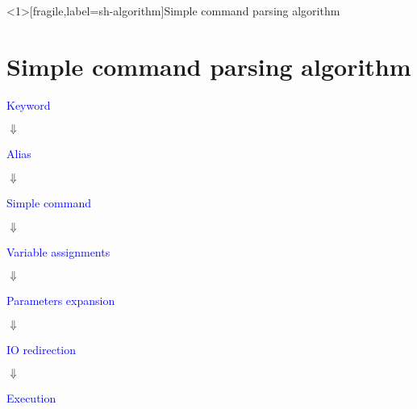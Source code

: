 % 
\begin{frame}<1>[fragile,label=sh-algorithm]{Simple command parsing algorithm}
\section{Simple command parsing algorithm}
\par\vspace{-1em}

\centering \large

\textcolor<2->{blue}{Keyword}

$\Downarrow$

\textcolor<3->{blue}{Alias}

$\Downarrow$

\textcolor<4->{blue}{Simple command}

$\Downarrow$

\textcolor<5->{blue}{Variable assignments}

$\Downarrow$

\textcolor<7->{blue}{Parameters expansion}

$\Downarrow$

\textcolor<6->{blue}{IO redirection}

$\Downarrow$

\textcolor<8->{blue}{Execution}

\end{frame}
